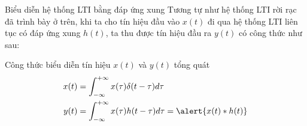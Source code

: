 \documentclass[8pt]{beamer}
\begin{document}
\begin{frame}{Biểu diễn hệ thống LTI bằng đáp ứng xung}
Tương tự như hệ thống LTI rời rạc đã trình bày ở trên, khi ta cho tín hiệu đầu vào $x(t)$ đi qua hệ thống LTI liên tục có đáp ứng xung $h(t)$, ta thu được tín hiệu đầu ra $y(t)$ có công thức như sau:
\begin{block}{Công thức biểu diễn tín hiệu $x(t)$ và $y(t)$ tổng quát}
	\begin{equation*}
	\begin{split}
		x(t)&=\int_{-\infty}^{+\infty}x(\tau)\delta(t-\tau)d\tau\\
		y(t)&=\int_{-\infty}^{+\infty}x(\tau)h(t-\tau)d\tau=\alert{x(t)*h(t)}\\
	\end{split}
	\end{equation*}
\end{block}
\end{frame}
\end{document}
